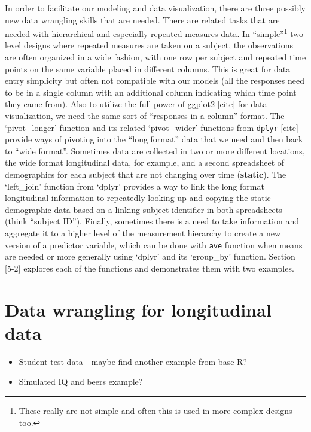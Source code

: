 \documentclass[
]{book}
\begin{document}
In order to facilitate our modeling and data visualization, there are three possibly new data wrangling skills that are needed. There are related tasks that are needed with hierarchical and especially repeated measures data. In ``simple''\footnote{These really are not simple and often this is used in more complex designs too.} two-level designs where repeated measures are taken on a subject, the observations are often organized in a wide fashion, with one row per subject and repeated time points on the same variable placed in different columns. This is great for data entry simplicity but often not compatible with our models (all the responses need to be in a single column with an additional column indicating which time point they came from). Also to utilize the full power of ggplot2 {[}cite{]} for data visualization, we need the same sort of ``responses in a column'' format. The `pivot\_longer' function and its related `pivot\_wider' functions from \texttt{dplyr} {[}cite{]} provide ways of pivoting into the ``long format'' data that we need and then back to ``wide format''. Sometimes data are collected in two or more different locations, the wide format longitudinal data, for example, and a second spreadsheet of demographics for each subject that are not changing over time (\textbf{static}). The `left\_join' function from `dplyr' provides a way to link the long format longitudinal information to repeatedly looking up and copying the static demographic data based on a linking subject identifier in both spreadsheets (think ``subject ID''). Finally, sometimes there is a need to take information and aggregate it to a higher level of the measurement hierarchy to create a new version of a predictor variable, which can be done with \texttt{ave} function when means are needed or more generally using `dplyr' and its `group\_by' function. Section {[}5-2{]} explores each of the functions and demonstrates them with two examples.

\hypertarget{section5-2}{%
\section{Data wrangling for longitudinal data}\label{section5-2}}

\begin{itemize}
\item
  Student test data - maybe find another example from base R?
\item
  Simulated IQ and beers example?
\end{itemize}
\end{document}
